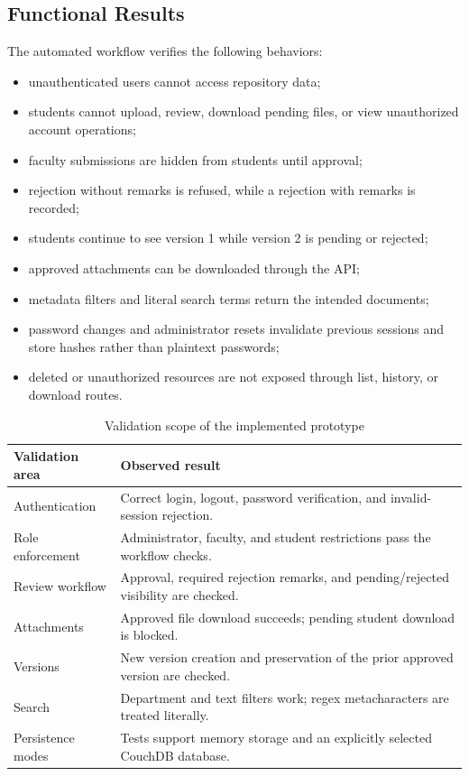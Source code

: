 \documentclass[conference]{IEEEtran}
\begin{document}
\subsection{Functional Results}
The automated workflow verifies the following behaviors:
\begin{itemize}
    \item unauthenticated users cannot access repository data;
    \item students cannot upload, review, download pending files, or view unauthorized account operations;
    \item faculty submissions are hidden from students until approval;
    \item rejection without remarks is refused, while a rejection with remarks is recorded;
    \item students continue to see version 1 while version 2 is pending or rejected;
    \item approved attachments can be downloaded through the API;
    \item metadata filters and literal search terms return the intended documents;
    \item password changes and administrator resets invalidate previous sessions and store hashes rather than plaintext passwords;
    \item deleted or unauthorized resources are not exposed through list, history, or download routes.
\end{itemize}

\begin{table}[t]
\caption{Validation scope of the implemented prototype}
\label{tab:validation}
\centering
\small
\begin{tabular}{p{} p{}}
\toprule
\textbf{Validation area} & \textbf{Observed result}\\
\midrule
Authentication & Correct login, logout, password verification, and invalid-session rejection.\\
Role enforcement & Administrator, faculty, and student restrictions pass the workflow checks.\\
Review workflow & Approval, required rejection remarks, and pending/rejected visibility are checked.\\
Attachments & Approved file download succeeds; pending student download is blocked.\\
Versions & New version creation and preservation of the prior approved version are checked.\\
Search & Department and text filters work; regex metacharacters are treated literally.\\
Persistence modes & Tests support memory storage and an explicitly selected CouchDB database.\\
\bottomrule
\end{tabular}
\end{table}
\end{document}
